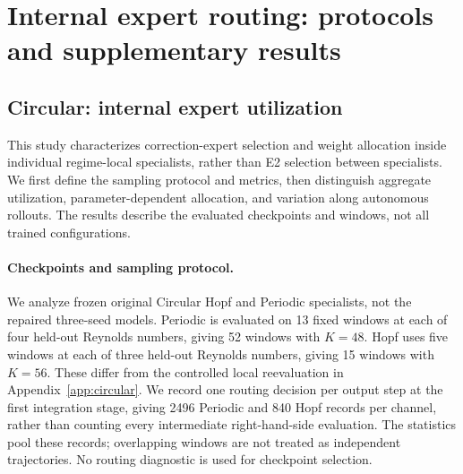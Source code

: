 
\section{Internal expert routing: protocols and supplementary results}
\label{app:routing_physics}

\subsection{Circular: internal expert utilization}
\label{app:internal_routing}

This study characterizes correction-expert selection and weight allocation
inside individual regime-local specialists, rather than E2 selection
between specialists. We first define the sampling protocol and metrics,
then distinguish aggregate utilization, parameter-dependent allocation,
and variation along autonomous rollouts. The results describe the
evaluated checkpoints and windows, not all trained configurations.

\paragraph{Checkpoints and sampling protocol.}
We analyze frozen original Circular Hopf and Periodic specialists,
not the repaired three-seed models. Periodic is evaluated on 13 fixed
windows at each of four held-out Reynolds numbers, giving 52 windows
with $K=48$. Hopf uses five windows at each of three held-out Reynolds
numbers, giving 15 windows with $K=56$. These differ from the controlled
local reevaluation in Appendix~\ref{app:circular}.
We record one routing decision per output step at the first integration
stage, giving 2496 Periodic and 840 Hopf records per channel, rather
than counting every intermediate right-hand-side evaluation.
The statistics pool these records; overlapping windows are not treated
as independent trajectories. No routing diagnostic is used for
checkpoint selection.

